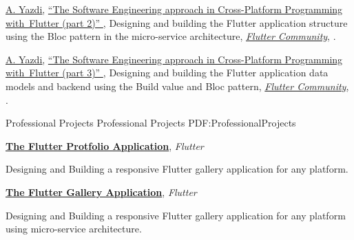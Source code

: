 \documentclass[letterpaper,MMMyyyy,nonstopmode]{resume}
\newcommand{\CVWebpage}{https://aliyazdi.tech/}
\begin{document}
\begin{Body}
\Gap
\NumberedItem{[2]}
\href{https://medium.com/@aliyazdi75}
{\underline{A. Yazdi}},
\href{https://medium.com/flutter-community/the-software-engineering-approach-in-cross-platform-programming-with-flutter-part-2-f7b75056102}
{
``The Software Engineering approach in Cross-Platform Programming  with Flutter (part 2)''
},
\newline Designing and building the Flutter application structure using the Bloc pattern in the micro-service architecture,
\href{https://medium.com/flutter-community}
{\textit{Flutter Community}},
.

\Gap
\NumberedItem{[3]}
\href{https://medium.com/@aliyazdi75}
{\underline{A. Yazdi}},
\href{https://medium.com/flutter-community/the-software-engineering-approach-in-cross-platform-programming-with-flutter-part-3-34c6eff02af0}
{
``The Software Engineering approach in Cross-Platform Programming  with Flutter (part 3)''
},
\newline Designing and building the Flutter application data models and backend using the Build value and Bloc pattern,
\href{https://medium.com/flutter-community}
{\textit{Flutter Community}},
.

\endgroup




\Section
{Professional\newline
Projects}
{Professional Projects}
{PDF:ProfessionalProjects}

\BigGap
\BulletItem
\href{https://github.com/aliyazdi75/aliyazdi75.github.io}
{\textbf{The Flutter Protfolio Application}},
\textit{\small{Flutter}}
\hfill
\normalsize{
\href{https://github.com/aliyazdi75/aliyazdi75.github.io/releases}
{\faAndroid}
\href{https://snapcraft.io/aliyazdi75}
{\faLinux}
\href{\CVWebpage}
{\faGlobe}
}
\begin{Detail}
\SubBulletItem
Designing and Building a responsive Flutter gallery application for any platform.
\end{Detail}

\BigGap
\BulletItem
\href{https://github.com/aliyazdi75/gallery}
{\textbf{The Flutter Gallery Application}},
\textit{\small{Flutter}}
\hfill
\normalsize{
\href{https://github.com/aliyazdi75/gallery/releases}
{\faAndroid}
\href{https://snapcraft.io/aliyazdi75}
{\faLinux}
\href{https://aliyazdi75.github.io/gallery}
{\faGlobe}
}
\begin{Detail}
\SubBulletItem
Designing and Building a responsive Flutter gallery application for any platform using micro-service architecture.
\end{Detail}


\end{Body}
\end{document}
